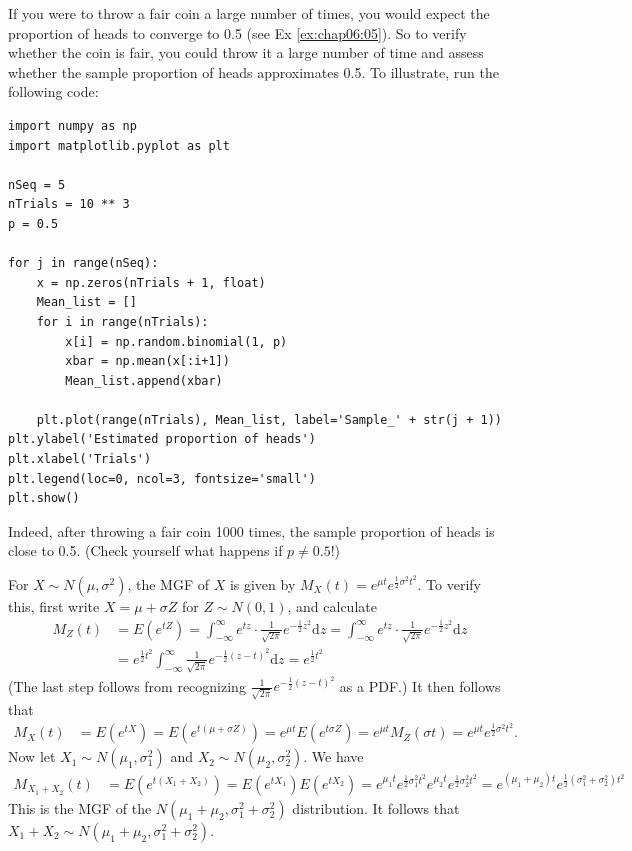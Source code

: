 \begin{Solution}{1.15}
		If you were to throw a fair coin a large number of times, you would expect the proportion of heads to converge to 0.5 (see Ex \ref{ex:chap06:05}). So to verify whether the coin is fair, you could throw it a large number of time and assess whether the sample proportion of heads approximates 0.5. To illustrate, run the following code:
\begin{verbatim}
import numpy as np
import matplotlib.pyplot as plt

nSeq = 5
nTrials = 10 ** 3
p = 0.5

for j in range(nSeq):
    x = np.zeros(nTrials + 1, float)
    Mean_list = []
    for i in range(nTrials):
        x[i] = np.random.binomial(1, p)
        xbar = np.mean(x[:i+1])
        Mean_list.append(xbar)

    plt.plot(range(nTrials), Mean_list, label='Sample_' + str(j + 1))
plt.ylabel('Estimated proportion of heads')
plt.xlabel('Trials')
plt.legend(loc=0, ncol=3, fontsize='small')
plt.show()
\end{verbatim}
		Indeed, after throwing a fair coin 1000 times, the sample proportion of heads is close to 0.5. (Check yourself what happens if $p \neq 0.5$!)
		
\end{Solution}
\begin{Solution}{1.16}
			For $X \sim N(\mu, \sigma^2)$, the MGF of $X$ is given by $M_X(t) = e^{\mu t} e^{\frac{1}{2} \sigma^2 t^2}$. To verify this, first write $X = \mu + \sigma Z$ for $Z \sim N(0,1)$, and calculate
			\begin{align*}
				M_Z(t) & = E(e^{tZ}) = \int_{-\infty}^{\infty} e^{tz} \cdot \frac{1}{\sqrt{2 \pi}} e^{-\frac{1}{2} z^2} \mathrm{d}z = \int_{-\infty}^{\infty} e^{tz} \cdot \frac{1}{\sqrt{2 \pi}} e^{-\frac{1}{2} z^2} \mathrm{d}z \\
				& = e^{\frac{1}{2} t^2} \int_{-\infty}^{\infty} \frac{1}{\sqrt{2 \pi}} e^{-\frac{1}{2} (z - t)^2} \mathrm{d}z = e^{\frac{1}{2} t^2}
			\end{align*}
			(The last step follows from recognizing $\frac{1}{\sqrt{2 \pi}} e^{-\frac{1}{2} (z - t)^2}$ as a PDF.) It then follows that
			\begin{align*}
				M_X(t) & = E\left(e^{tX}\right) = E\left(e^{t(\mu + \sigma Z)}\right) = e^{\mu t} E\left(e^{t \sigma Z}\right) = e^{\mu t} M_Z(\sigma t) = e^{\mu t} e^{\frac{1}{2} \sigma^2 t^2}.
			\end{align*}
			Now let $X_1\sim N(\mu_1, \sigma_1^2)$ and $X_2\sim N(\mu_2, \sigma_2^2)$. We have
			\begin{align*}
				M_{X_1 + X_2}(t) & = E\left(e^{t(X_1 + X_2)}\right) = E\left(e^{t X_1}\right) E\left(e^{t X_2}\right) = e^{\mu_1 t} e^{\frac{1}{2} \sigma_1^2 t^2} e^{\mu_2 t} e^{\frac{1}{2} \sigma_2^2 t^2} = e^{(\mu_1 + \mu_2) t} e^{\frac{1}{2} (\sigma_1^2 + \sigma_2^2) t^2}
			\end{align*}
			This is the MGF of the $N(\mu_1 + \mu_2, \sigma_1^2 + \sigma_2^2)$ distribution. It follows that $X_1 + X_2 \sim N(\mu_1 + \mu_2, \sigma_1^2 + \sigma_2^2)$.
		
\end{Solution}
